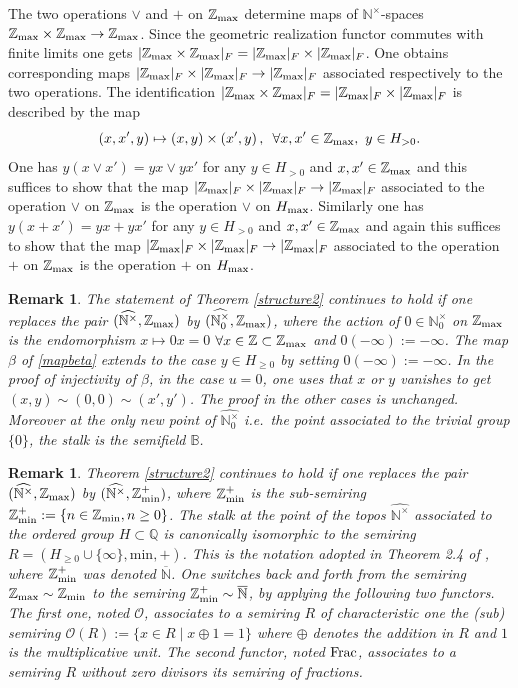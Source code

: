\documentclass[noams,lp]{compositio}
\newtheorem{rem}[thm]{Remark}
\def\B{{\mathbb B}}
\def\N{{\mathbb N}}
\def\Q{{\mathbb Q}}
\def\Z{{\mathbb Z}}
\def\cO{{\mathcal O}}
\def\qqq{\,,\,~\forall}
\newcommand{\ie}{{\it i.e.\/}\ }
\def\zmin{\Z_{\rm min}}
\def\zminp{\Z_{\rm min}^+}
\def\zmax{{\Z_{\rm max}}}
\def\arith{{(\wnt,\bar \N)}}
\def\nt{\N^{\times}}
\def\wnt{{\widehat{\N^{\times}}}}
\def\nto{\N_0^{\times}}
\def\wnto{{\widehat{\nto}}}
\def\arith{{(\wnt,\zmax)}}
\begin{document}
 
The two operations $\vee$ and $+$ on $\zmax$  determine maps of $\nt$-spaces $\zmax\times \zmax\to\zmax$. Since the geometric realization functor commutes with finite limits one 
gets $|\zmax\times \zmax|_F=|\zmax|_F\times |\zmax|_F$. One  obtains corresponding maps 
$|\zmax|_F\times |\zmax|_F\to |\zmax|_F$ associated respectively to the two operations. The identification $|\zmax\times \zmax|_F=|\zmax|_F\times |\zmax|_F$ is described by the map
$$
(x,x',y)\mapsto (x,y) \times (x',y)\qqq x,x'\in\zmax, \  y\in H_{>0}.
$$
 One has $y(x\vee x')=yx\vee yx'$ for any $y\in H_{>0}$ and $x,x'\in\zmax$ and this suffices to show that the map $|\zmax|_F\times |\zmax|_F\to |\zmax|_F$ associated to the operation $\vee$ on $\zmax$ is the operation $\vee$ on $H_{\rm max}$. Similarly one has $y(x + x')=yx+ yx'$ for any $y\in H_{>0}$ and $x,x'\in\zmax$ and again this suffices to show that the map $|\zmax|_F\times |\zmax|_F\to |\zmax|_F$ associated to the operation $+$ on $\zmax$ is the operation $+$ on $H_{\rm max}$.
\endproof
\begin{rem}\label{caseno}{\rm The statement of Theorem \ref{structure2} continues to hold if one replaces the pair $\arith$ by $(\wnto,\zmax)$, where the action of $0\in \nto$ on $\zmax$ is the endomorphism $x\mapsto 0x=0$ $\forall x\in\Z\subset \zmax$ and $0(-\infty):=-\infty$. The map $\beta$ of \eqref{mapbeta} extends to the case $y\in H_{\geq 0}$ by setting $0(-\infty):=-\infty$. In the proof of injectivity of $\beta$, in the case $u=0$, one uses that $x$ or $y$ vanishes to get $(x,y)\sim (0,0)\sim (x',y')$. The proof in the other cases is unchanged. Moreover at the only new point of $\wnto$ \ie the point associated to the trivial group $\{0\}$, the stalk is the semifield $\B$.
}\end{rem}
\begin{rem}\label{casenote}{\rm  Theorem \ref{structure2} continues to hold if one replaces the pair $\arith$ by $(\wnt,\zminp)$, where $\zminp$ is the sub-semiring $\zminp:=\{n\in\zmin, n\geq 0\}$. The stalk at the point of the topos $\wnt$ associated to the ordered group $H\subset \Q$  is canonically isomorphic to the semiring 
$
R=(H_{\geq 0}\cup\{\infty\},\text{min},+)
$. This is the notation adopted in Theorem 2.4 of \cite{CCas}, where $\zminp$ was denoted $\overline\N$. One switches back and forth from the semiring $\zmax\sim \zmin$ to the semiring $\zminp\sim \overline\N$, by applying the following two functors. The first one, noted $\cO$, associates to a semiring $R$ of characteristic one the (sub) semiring $\cO(R):=\{x\in R\mid x\oplus 1=1\}$ where $\oplus$ denotes the addition in $R$ and $1$ is the multiplicative unit. The second functor, noted ${\rm Frac}$, associates to a semiring $R$ without zero divisors its semiring of fractions.
}\end{rem}
\end{document}
